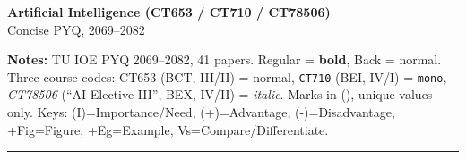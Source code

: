 \documentclass[10pt]{article}
\begin{document}
\begin{center}
  {\Large\bfseries Artificial Intelligence (CT653 / CT710 / CT78506)}\\[0.2em]
  {\large Concise PYQ, 2069--2082}
\end{center}
\vspace{2pt}
\small
\textbf{Notes:} TU IOE PYQ 2069--2082, 41 papers. Regular = \textbf{bold}, Back = normal. Three course codes: CT653 (BCT, III/II) = normal, \texttt{CT710} (BEI, IV/I) = \texttt{mono}, \textit{CT78506} (``AI Elective III'', BEX, IV/II) = \textit{italic}. Marks in (), unique values only.
Keys: (I)=Importance/Need, (+)=Advantage, (-)=Disadvantage, +Fig=Figure, +Eg=Example, Vs=Compare/Differentiate.
\vspace{2pt}
\hrule
\vspace{4pt}
\end{document}

